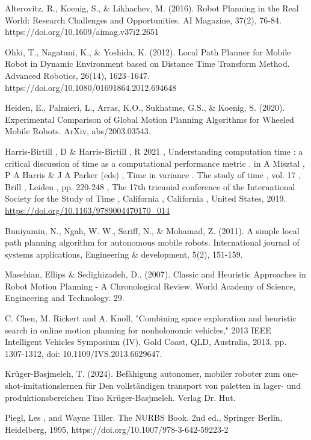 \begin{thebibliography}{9}
Alterovitz, R., Koenig, S., \& Likhachev, M. (2016). Robot Planning in the Real World: Research Challenges and Opportunities. 
AI Magazine, 37(2), 76-84. https://doi.org/10.1609/aimag.v37i2.2651

Ohki, T., Nagatani, K., \& Yoshida, K. (2012). Local Path Planner for Mobile Robot in Dynamic Environment based on Distance 
Time Transform Method. Advanced Robotics, 26(14), 1623–1647. https://doi.org/10.1080/01691864.2012.694648

Heiden, E., Palmieri, L., Arras, K.O., Sukhatme, G.S., \& Koenig, S. (2020). Experimental Comparison of Global Motion 
Planning Algorithms for Wheeled Mobile Robots. ArXiv, abs/2003.03543.

Harris-Birtill , D \& Harris-Birtill , R 2021 , Understanding computation time : a critical discussion 
of time as a computational performance metric . in A Misztal , P A Harris \& J A Parker (eds) , 
Time in variance . The study of time , vol. 17 , Brill , Leiden , pp. 220-248 , The 17th triennial 
conference of the International Society for the Study of Time , California , California , 
United States, 2019. \url{https://doi.org/10.1163/9789004470170_014}

Buniyamin, N., Ngah, W. W., Sariff, N., \& Mohamad, Z. (2011). A simple local path planning algorithm 
for autonomous mobile robots. International journal of systems applications, Engineering \& development, 
5(2), 151-159.

Masehian, Ellips \& Sedighizadeh, D.. (2007). Classic and Heuristic Approaches in Robot Motion Planning - 
A Chronological Review. World Academy of Science, Engineering and Technology. 29. 

C. Chen, M. Rickert and A. Knoll, "Combining space exploration and heuristic search in online motion 
planning for nonholonomic vehicles," 2013 IEEE Intelligent Vehicles Symposium (IV), Gold Coast, QLD, 
Australia, 2013, pp. 1307-1312, doi: 10.1109/IVS.2013.6629647. 

Kr\"uger-Basjmeleh, T. (2024). Bef\"ahigung autonomer, mobiler roboter zum one-shot-imitationslernen f\"ur 
Den vollst\"andigen transport von paletten in lager- und produktionsbereichen Tino Kr\"uger-Basjmeleh. Verlag Dr. Hut.

Piegl, Les , and Wayne Tiller. The NURBS Book. 2nd ed., Springer Berlin, 
Heidelberg, 1995, https://doi.org/10.1007/978-3-642-59223-2


\end{thebibliography}
